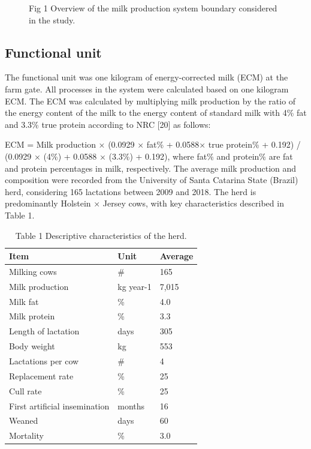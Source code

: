 \documentclass[11pt,a4paper]{article}
\begin{document}
\begin{figure}[h]
\caption{Fig 1 Overview of the milk production system boundary considered in the study.}
\end{figure}

\subsection{Functional unit}

The functional unit was one kilogram of energy-corrected milk (ECM) at the farm gate. All processes in the system were calculated based on one kilogram ECM. The ECM was calculated by multiplying milk production by the ratio of the energy content of the milk to the energy content of standard milk with 4\% fat and 3.3\% true protein according to NRC [20] as follows:

ECM = Milk production × (0.0929 × fat\% + 0.0588× true protein\% + 0.192) / (0.0929 × (4\%) + 0.0588 × (3.3\%) + 0.192), where fat\% and protein\% are fat and protein percentages in milk, respectively. The average milk production and composition were recorded from the University of Santa Catarina State (Brazil) herd, considering 165 lactations between 2009 and 2018. The herd is predominantly Holstein × Jersey cows, with key characteristics described in Table 1.

\begin{table}[h]
\caption{Table 1 Descriptive characteristics of the herd.}
\begin{tabular}{|l|l|l|}
\hline
Item & Unit & Average \\ \hline
Milking cows & \# & 165 \\ \hline
Milk production & kg year-1 & 7,015 \\ \hline
Milk fat & \% & 4.0 \\ \hline
Milk protein & \% & 3.3 \\ \hline
Length of lactation & days & 305 \\ \hline
Body weight & kg & 553 \\ \hline
Lactations per cow & \# & 4 \\ \hline
Replacement rate & \% & 25 \\ \hline
Cull rate & \% & 25 \\ \hline
First artificial insemination & months & 16 \\ \hline
Weaned & days & 60 \\ \hline
Mortality & \% & 3.0 \\ \hline
\end{tabular}
\end{table}
\end{document}
